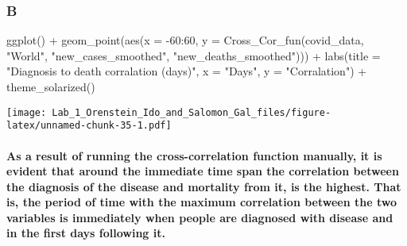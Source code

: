 \documentclass[
]{article}
\newenvironment{Shaded}{\begin{snugshade}}{\end{snugshade}}
\newcommand{\AttributeTok}[1]{\textcolor[rgb]{0.77,0.63,0.00}{#1}}
\newcommand{\DecValTok}[1]{\textcolor[rgb]{0.00,0.00,0.81}{#1}}
\newcommand{\FunctionTok}[1]{\textcolor[rgb]{0.00,0.00,0.00}{#1}}
\newcommand{\NormalTok}[1]{#1}
\newcommand{\SpecialCharTok}[1]{\textcolor[rgb]{0.00,0.00,0.00}{#1}}
\newcommand{\StringTok}[1]{\textcolor[rgb]{0.31,0.60,0.02}{#1}}
\begin{document}
\hypertarget{b-5}{%
\subsubsection{B}\label{b-5}}

\begin{Shaded}
\begin{Highlighting}[]
\FunctionTok{ggplot}\NormalTok{() }\SpecialCharTok{+}
  \FunctionTok{geom\_point}\NormalTok{(}\FunctionTok{aes}\NormalTok{(}\AttributeTok{x =} \SpecialCharTok{{-}}\DecValTok{60}\SpecialCharTok{:}\DecValTok{60}\NormalTok{, }\AttributeTok{y =} \FunctionTok{Cross\_Cor\_fun}\NormalTok{(covid\_data, }\StringTok{"World"}\NormalTok{, }\StringTok{"new\_cases\_smoothed"}\NormalTok{, }\StringTok{"new\_deaths\_smoothed"}\NormalTok{))) }\SpecialCharTok{+}
  \FunctionTok{labs}\NormalTok{(}\AttributeTok{title =} \StringTok{"Diagnosis to death corralation (days)"}\NormalTok{, }\AttributeTok{x =} \StringTok{"Days"}\NormalTok{, }\AttributeTok{y =} \StringTok{"Corralation"}\NormalTok{) }\SpecialCharTok{+}
  \FunctionTok{theme\_solarized}\NormalTok{()}
\end{Highlighting}
\end{Shaded}

\texttt{[image: Lab\_1\_Orenstein\_Ido\_and\_Salomon\_Gal\_files/figure-latex/unnamed-chunk-35-1.pdf]}

\hypertarget{as-a-result-of-running-the-cross-correlation-function-manually-it-is-evident-that-around-the-immediate-time-span-the-correlation-between-the-diagnosis-of-the-disease-and-mortality-from-it-is-the-highest.-that-is-the-period-of-time-with-the-maximum-correlation-between-the-two-variables-is-immediately-when-people-are-diagnosed-with-disease-and-in-the-first-days-following-it.}{%
\paragraph{As a result of running the cross-correlation function
manually, it is evident that around the immediate time span the
correlation between the diagnosis of the disease and mortality from it,
is the highest. That is, the period of time with the maximum correlation
between the two variables is immediately when people are diagnosed with
disease and in the first days following
it.}\label{as-a-result-of-running-the-cross-correlation-function-manually-it-is-evident-that-around-the-immediate-time-span-the-correlation-between-the-diagnosis-of-the-disease-and-mortality-from-it-is-the-highest.-that-is-the-period-of-time-with-the-maximum-correlation-between-the-two-variables-is-immediately-when-people-are-diagnosed-with-disease-and-in-the-first-days-following-it.}}
\end{document}
